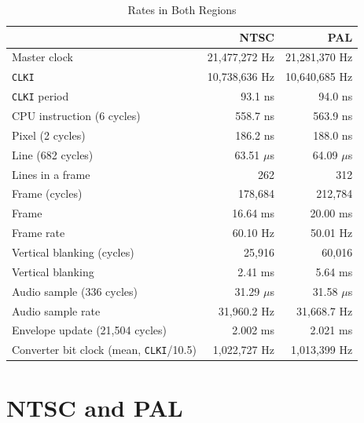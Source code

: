 \begin{table}[H]
	\centering
	\begin{tabular}{lrr}
		\toprule
		                                               & \textbf{NTSC} & \textbf{PAL}  \\
		\midrule
		Master clock                                   & 21,477,272 Hz & 21,281,370 Hz \\
		\texttt{CLKI}                                  & 10,738,636 Hz & 10,640,685 Hz \\
		\texttt{CLKI} period                           & 93.1 ns       & 94.0 ns       \\
		CPU instruction (6 cycles)                     & 558.7 ns      & 563.9 ns      \\
		Pixel (2 cycles)                               & 186.2 ns      & 188.0 ns      \\
		Line (682 cycles)                              & 63.51 $\mu$s  & 64.09 $\mu$s  \\
		Lines in a frame                               & 262           & 312           \\
		Frame (cycles)                                 & 178,684       & 212,784       \\
		Frame                                          & 16.64 ms      & 20.00 ms      \\
		Frame rate                                     & 60.10 Hz      & 50.01 Hz      \\
		Vertical blanking (cycles)                     & 25,916        & 60,016        \\
		Vertical blanking                              & 2.41 ms       & 5.64 ms       \\
		Audio sample (336 cycles)                      & 31.29 $\mu$s  & 31.58 $\mu$s  \\
		Audio sample rate                              & 31,960.2 Hz   & 31,668.7 Hz   \\
		Envelope update (21,504 cycles)                & 2.002 ms      & 2.021 ms      \\
		Converter bit clock (mean, \texttt{CLKI}/10.5) & 1,022,727 Hz  & 1,013,399 Hz  \\
		\bottomrule
	\end{tabular}
	\caption{Rates in Both Regions}
	\label{tab:system-rates}
\end{table}

\section{NTSC and PAL}
\label{sec:regions}

